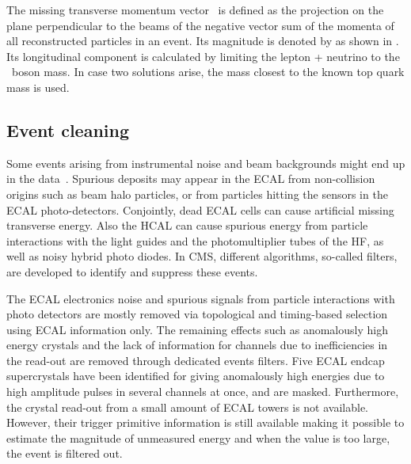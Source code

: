 The missing transverse momentum vector \ptmisvec\ is defined as the projection on the plane perpendicular to the beams of the negative vector sum of the momenta of all reconstructed particles in an event. Its magnitude is denoted by \Etmis as shown in . Its longitudinal component is calculated by limiting the lepton + neutrino to the \PW\ boson mass. In case two solutions arise, the mass closest to the known top quark mass is used. 


\subsection{Event cleaning}
\label{sec:Filters}

Some events arising from instrumental noise and beam backgrounds might end up in the data~\cite{Filters,CMS-PAS-JME-16-004}. Spurious deposits may appear in the ECAL from non-collision origins such as beam halo particles, or from particles hitting the sensors in the ECAL photo-detectors. Conjointly, dead ECAL cells can cause artificial missing transverse energy. Also the HCAL can cause spurious energy from particle interactions with the light guides and the photomultiplier tubes of the HF, as well as noisy hybrid photo diodes. In CMS, different algorithms, so-called filters, are developed to identify and suppress these events. 


The ECAL electronics noise and spurious signals from particle interactions with photo detectors are mostly removed via topological and timing-based selection using  ECAL information only. The remaining effects such as anomalously high energy crystals and the lack of information for channels due to inefficiencies in the read-out are removed through dedicated events filters. Five ECAL endcap supercrystals have been identified for giving anomalously high energies due to high amplitude pulses in several channels at once, and are masked. Furthermore, the crystal read-out from a small amount of ECAL towers is not available. However, their trigger primitive information is still available making it possible to estimate the magnitude of unmeasured energy and when the value is too large, the event is filtered out. 


